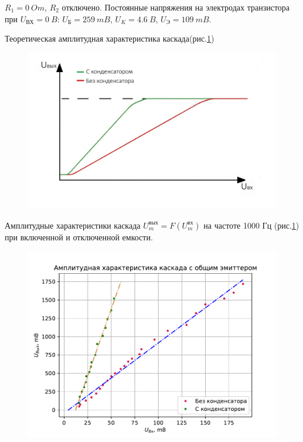 $R_1=0 ~ Om$, $R_2$ отключено. Постоянные напряжения на электродах транзистора при $U_{\text{ВХ}}=0 ~B$: $U_{\text{Б}}=259 ~mB$, $U_K=4.6~ B$, $U_{\text{Э}}=109 ~mB$.

Теоретическая амплитудная характеристика каскада(рис.\ref{fig:10})

\begin{figure}[H]
	\centering
	\includegraphics[width=0.7\linewidth]{fig/fig13}
	\caption{}
	\label{fig:10}
\end{figure}

Амплитудные характеристики каскада $U_m^{\text{вых}}=F(U_m^{\text{вх}})$ на частоте 1000 Гц (рис.\ref{fig:10}) при включенной и отключенной емкости.

\begin{figure}[H]
	\centering
	\includegraphics[width=0.9\linewidth]{script/z23}
	\caption{}
	\label{fig:11}
\end{figure}



